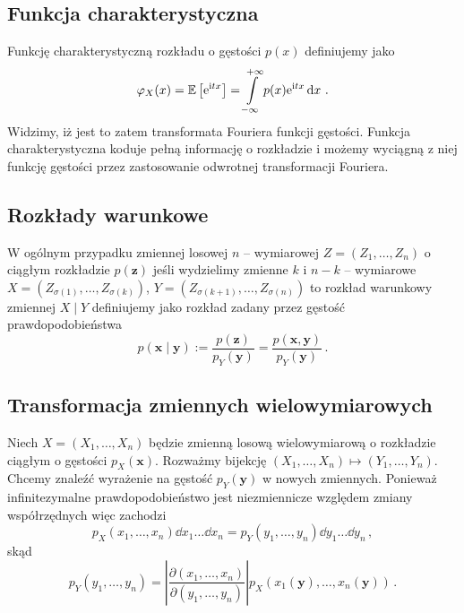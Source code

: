 \documentclass{myclass}
\begin{document}
\subsection{Funkcja charakterystyczna}

Funkcję charakterystyczną rozkładu o gęstości \(p(x)\) definiujemy jako
\begin{equation*}
    \varphi_X(x) = \mathbb{E}\left[\mathrm{e}^{\mathrm{i} t x}\right] = \int\limits_{-\infty}^{+\infty} p(x)\mathrm{e}^{\mathrm{i} tx} \dd{x}\,.
\end{equation*}
Widzimy, iż jest to zatem transformata Fouriera funkcji gęstości. Funkcja charakterystyczna koduje
pełną informację o rozkładzie i możemy wyciągną z niej funkcję gęstości przez zastosowanie odwrotnej
transformacji Fouriera.

\subsection{Rozkłady warunkowe}

W ogólnym przypadku zmiennej losowej \(n\) -- wymiarowej \(Z = (Z_1, \ldots, Z_n)\) o ciągłym
rozkładzie \(p(\mathbf{z})\) jeśli wydzielimy zmienne \(k\) i \(n-k\) -- wymiarowe \(X =
(Z_{\sigma(1)}, \ldots, Z_{\sigma(k)})\), \(Y = (Z_{\sigma(k+1)}, \ldots, Z_{\sigma(n)})\) to
rozkład warunkowy zmiennej \(X \mid Y\) definiujemy jako rozkład zadany przez gęstość
prawdopodobieństwa
\begin{equation*}
    p(\mathbf{x} \mid \mathbf{y}) := \frac{p(\mathbf{z})}{p_Y(\mathbf{y})} = \frac{p(\mathbf{x},\mathbf{y})}{p_Y(\mathbf{y})}\,.
\end{equation*}

\subsection{Transformacja zmiennych wielowymiarowych}

Niech \(X = (X_1, \ldots, X_n)\) będzie zmienną losową wielowymiarową o rozkładzie ciągłym o
gęstości \(p_X(\mathbf{x})\). Rozważmy bijekcję \((X_1, \ldots, X_n) \mapsto (Y_1, \ldots, Y_n)\).
Chcemy znaleźć wyrażenie na gęstość \(p_Y(\mathbf{y})\) w nowych zmiennych. Ponieważ infinitezymalne
prawdopodobieństwo jest niezmiennicze względem zmiany współrzędnych więc zachodzi
\begin{equation*}
    p_X(x_1,\ldots, x_n)\dd{x_1}\ldots\dd{x_n} = p_Y(y_1,\ldots, y_n)\dd{y_1}\ldots\dd{y_n}\,,
\end{equation*}
skąd
\begin{equation*}
    p_Y(y_1,\ldots,y_n) = \left|\frac{\partial(x_1,\ldots,x_n)}{\partial(y_1,\ldots,y_n)}\right|p_X(x_1(\mathbf{y}),\ldots,x_n(\mathbf{y}))\,.
\end{equation*}
\end{document}
